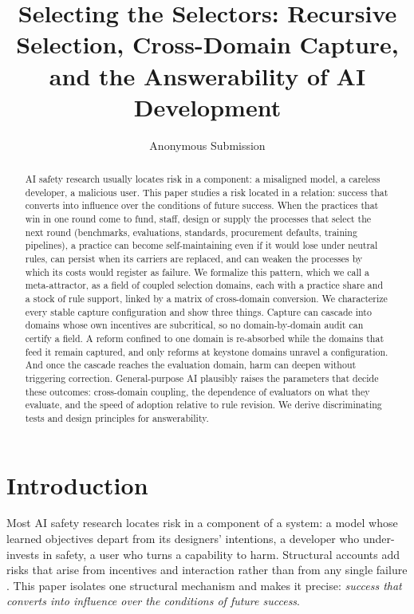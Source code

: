 \documentclass[letterpaper]{article} %
\title{Selecting the Selectors: Recursive Selection, Cross-Domain Capture,\\and the Answerability of AI Development}
\author{Anonymous Submission}
\theoremstyle{definition}
\begin{document}
\maketitle

\begin{abstract}
AI safety research usually locates risk in a component: a misaligned model, a careless developer, a malicious user. This paper studies a risk located in a relation: success that converts into influence over the conditions of future success. When the practices that win in one round come to fund, staff, design or supply the processes that select the next round (benchmarks, evaluations, standards, procurement defaults, training pipelines), a practice can become self-maintaining even if it would lose under neutral rules, can persist when its carriers are replaced, and can weaken the processes by which its costs would register as failure. We formalize this pattern, which we call a meta-attractor, as a field of coupled selection domains, each with a practice share and a stock of rule support, linked by a matrix of cross-domain conversion. We characterize every stable capture configuration and show three things. Capture can cascade into domains whose own incentives are subcritical, so no domain-by-domain audit can certify a field. A reform confined to one domain is re-absorbed while the domains that feed it remain captured, and only reforms at keystone domains unravel a configuration. And once the cascade reaches the evaluation domain, harm can deepen without triggering correction. General-purpose AI plausibly raises the parameters that decide these outcomes: cross-domain coupling, the dependence of evaluators on what they evaluate, and the speed of adoption relative to rule revision. We derive discriminating tests and design principles for answerability.
\end{abstract}

\section{Introduction}

Most AI safety research locates risk in a component of a system: a model whose learned objectives depart from its designers' intentions, a developer who under-invests in safety, a user who turns a capability to harm. Structural accounts add risks that arise from incentives and interaction rather than from any single failure \citep{zwetsloot2019,critch2020,kulveit2025,hammond2025}. This paper isolates one structural mechanism and makes it precise: \emph{success that converts into influence over the conditions of future success}.
\end{document}
